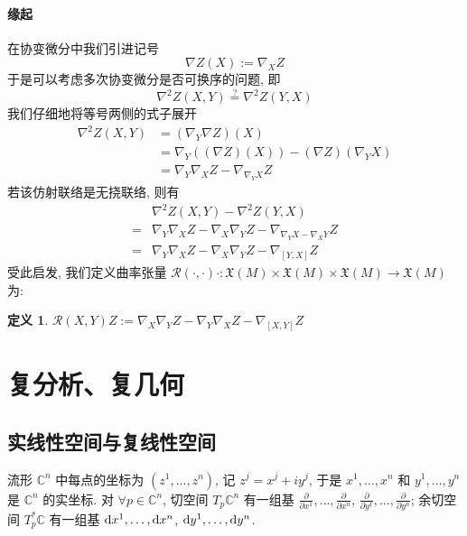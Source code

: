 \documentclass{book}
\newtheorem{definition}[theorem]{\indent 定义}
\newcommand{\md}{{\rm d}}
\newcommand{\pd}[2]{\frac{\partial #1}{\partial #2}}
\begin{document}
    \subsubsection{缘起}
        在协变微分中我们引进记号
        \begin{equation*}
            \nabla Z(X) :=\nabla_X{Z}
        \end{equation*}
        于是可以考虑多次协变微分是否可换序的问题, 即
        \begin{equation*}
            \nabla^2Z(X,Y) \stackrel{?}{=} \nabla^2Z(Y,X)
        \end{equation*}
        我们仔细地将等号两侧的式子展开
        \begin{align*}
            \nabla^2Z(X,Y) &= (\nabla_Y\nabla Z)(X) \\
            &= \nabla_Y((\nabla Z)(X)) - (\nabla Z)(\nabla_Y{X}) \\
            &= \nabla_Y\nabla_X{Z}-\nabla_{\nabla_Y{X}}Z
        \end{align*}
        若该仿射联络是无挠联络, 则有
        \begin{align*}
            & \nabla^2Z(X,Y) - \nabla^2Z(Y,X) \\
            =& \nabla_Y\nabla_X{Z}-\nabla_X\nabla_Y{Z}-\nabla_{\nabla_Y{X}-\nabla_X{Y}}Z \\
            =& \nabla_Y\nabla_X{Z}-\nabla_X\nabla_Y{Z}-\nabla_{[Y,X]}Z
        \end{align*}
        受此启发, 我们定义曲率张量 $\mathcal{R}(\cdot,\cdot)\cdot:\mathfrak{X}(M)\times\mathfrak{X}(M)\times\mathfrak{X}(M)\rightarrow\mathfrak{X}(M)$ 为:
        \begin{definition}
            $\mathcal{R}(X,Y)Z := \nabla_X\nabla_Y{Z} - \nabla_Y\nabla_X{Z} - \nabla_{[X,Y]}Z$
        \end{definition}
        
    \chapter{复分析、复几何}
    \section{实线性空间与复线性空间}
        流形 $\mathbb{C}^n$ 中每点的坐标为 $(z^1,\dots,z^n)$, 记 $z^j=x^j+iy^j$, 于是 $x^1,\dots,x^n$ 和 $y^1,\dots,y^n$ 是 $\mathbb{C}^n$ 的实坐标.
        对 $\forall p\in\mathbb{C}^n$, 切空间 $T_p\mathbb{C}^n$ 有一组基 $\pd{}{x^1},\dots,\pd{}{x^n}$, $\pd{}{y^1},\dots,\pd{}{y^n}$; 余切空间 $T^*_p\mathbb{C}$
        有一组基 $\md x^1,\dots,\md x^n$, $\md y^1,\dots,\md y^n$.
\end{document}
